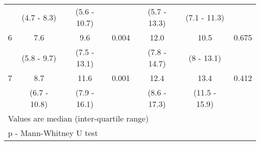 \begin{table}[h]
\begin{tabular}{| c | c c c | c c c |}
		           & (4.7 - 8.3)  & (5.6 - 10.7) &               & (5.7 - 13.3) & (7.1 - 11.3)  &  \\
		6          & 7.6          & 9.6          & 0.004         & 12.0         & 10.5          & 0.675 \\
		           & (5.8 - 9.7)  & (7.5 - 13.1) &               & (7.8 - 14.7) & (8 - 13.1)    &  \\
		7          & 8.7          & 11.6         & 0.001         & 12.4         & 13.4          & 0.412 \\
		           & (6.7 - 10.8) & (7.9 - 16.1) &               & (8.6 - 17.3) & (11.5 - 15.9) &  \\ \hline
		\multicolumn{7}{l}{Values are median (inter-quartile range)}                                          \\
		\multicolumn{7}{l}{p - Mann-Whitney U test}
	\end{tabular}
\end{table}
